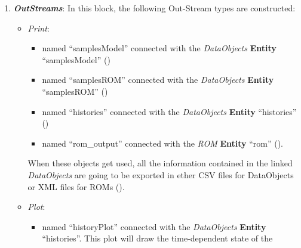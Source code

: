 \begin{enumerate}
   \item \textbf{\textit{OutStreams}}:
  In this block, the following Out-Stream types are constructed:
  \begin{itemize}
    \item \textit{Print}:
     \begin{itemize}
       \item named ``samplesModel'' connected with the \textit{DataObjects} \textbf{Entity} ``samplesModel''
                ()
       \item named ``samplesROM'' connected with the \textit{DataObjects} \textbf{Entity} ``samplesROM''
                ()
       \item named ``histories'' connected with the \textit{DataObjects} \textbf{Entity} ``histories'' ()
       \item named ``rom\_output'' connected with the \textit{ROM} \textbf{Entity} ``rom'' ().
     \end{itemize}
      When these objects get used, all the information contained in the
      linked  \textit{DataObjects} are going
    to be exported in ether CSV files for DataObjects or XML files for ROMs ().
    \item \textit{Plot}:
    \begin{itemize}
      \item named ``historyPlot'' connected with the  \textit{DataObjects}
      \textbf{Entity} ``histories''.  This plot will draw the time-dependent state of the

\end{itemize}
\end{itemize}
\end{enumerate}

